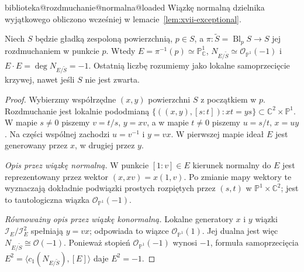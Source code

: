 \ifcsname biblioteka@rozdmuchanie@normalna@loaded\endcsname
Wiązkę normalną dzielnika wyjątkowego obliczono wcześniej
w lemacie~\ref{lem:xvii-exceptional}.
\else
\expandafter\gdef\csname biblioteka@rozdmuchanie@normalna@loaded\endcsname{}
\begin{lemat}
\label{st:ga6-exceptional-normal}\label{lem:xvii-exceptional}
Niech $S$ będzie gładką zespoloną powierzchnią, $p\in S$, a
$\pi:\widetilde S=\operatorname{Bl}_pS\to S$ jej rozdmuchaniem
w punkcie $p$. Wtedy $E=\pi^{-1}(p)\simeq\mathbb P^1_{\mathbb C}$,
$N_{E/\widetilde S}\simeq\mathcal O_{\mathbb P^1}(-1)$ i
$E\cdot E=\deg N_{E/\widetilde S}=-1$.
Ostatnią liczbę rozumiemy jako lokalne samoprzecięcie krzywej,
nawet jeśli $S$ nie jest zwarta.
\end{lemat}
\begin{proof}
Wybierzmy współrzędne $(x,y)$ powierzchni $S$ z początkiem w $p$.
Rozdmuchanie jest lokalnie pododmianą
$\{((x,y),[s:t])\colon xt=ys\}\subset\mathbb C^2\times\mathbb P^1$.
W mapie $s\ne0$ piszemy $v=t/s$, $y=xv$, a w mapie $t\ne0$
piszemy $u=s/t$, $x=uy$. Na części wspólnej zachodzi
$u=v^{-1}$ i $y=vx$. W pierwszej mapie ideał $E$ jest
generowany przez $x$, w drugiej przez $y$.

\emph{Opis przez wiązkę normalną.}
W punkcie $[1:v]\in E$ kierunek normalny do $E$ jest
reprezentowany przez wektor $(x,xv)=x(1,v)$.
Po zmianie mapy wektory te wyznaczają dokładnie
podwiązki prostych rozpiętych przez $(s,t)$ w
$\mathbb P^1\times\mathbb C^2$; jest to tautologiczna
wiązka $\mathcal O_{\mathbb P^1}(-1)$.

\emph{Równoważny opis przez wiązkę konormalną.}
Lokalne generatory $x$ i $y$ wiązki
$\mathcal I_E/\mathcal I_E^2$ spełniają $y=vx$;
odpowiada to wiązce $\mathcal O_{\mathbb P^1}(1)$.
Jej dualna jest więc $N_{E/\widetilde S}\cong\mathcal O(-1)$.
Ponieważ stopień $\mathcal O_{\mathbb P^1}(-1)$ wynosi $-1$,
formuła samoprzecięcia
$E^2=\langle c_1(N_{E/\widetilde S}),[E]\rangle$
daje $E^2=-1$.
\end{proof}
\fi
